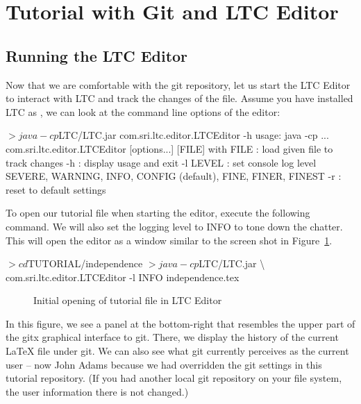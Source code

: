 \section{Tutorial with Git and LTC Editor} \label{sec:tutorial-git}

\subsection{Running the LTC Editor}

Now that we are comfortable with the git repository, let us start the LTC Editor to interact with LTC and track the changes of the file.  Assume you have installed LTC as , we can look at the command line options of the editor:
\begin{CodeVerbatim}[commandchars=\\\{\}]
$> java -cp $LTC/LTC.jar com.sri.ltc.editor.LTCEditor -h
usage: java -cp ... com.sri.ltc.editor.LTCEditor [options...] [FILE] 
with
 FILE     : load given file to track changes
 -h       : display usage and exit
 -l LEVEL : set console log level
            SEVERE, WARNING, INFO, CONFIG (default), FINE, FINER, FINEST
 -r       : reset to default settings
\end{CodeVerbatim}

To open our tutorial file when starting the editor, execute the following command.  We will also set the logging level to INFO to tone down the chatter.  This will open the editor as a window similar to the screen shot in Figure~\ref{fig:editor-open}.
\begin{CodeVerbatim}[samepage=true,commandchars=\\\{\}]
$> cd $TUTORIAL/independence
$> java -cp $LTC/LTC.jar \textbackslash
   com.sri.ltc.editor.LTCEditor -l INFO independence.tex
\end{CodeVerbatim}
\begin{figure}[t]
\centering
{}
\caption{Initial opening of tutorial file in LTC Editor} \label{fig:editor-open}
\end{figure}
In this figure, we see a panel at the bottom-right that resembles the upper part of the gitx graphical interface to git.  There, we display the history of the current LaTeX file under git.  We can also see what git currently perceives as the current user -- now John Adams because we had overridden the git settings in this tutorial repository.  (If you had another local git repository on your file system, the user information there is not changed.)

